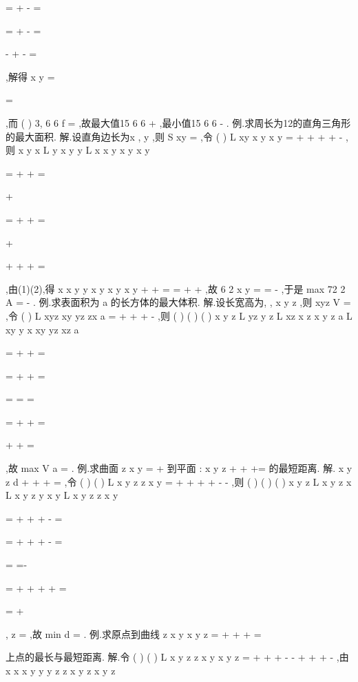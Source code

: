 =
+
\cdots 
-
=


=
+
\cdots 
-
=



-
+
-
=

,解得
x
y
=
\pm 

=
\pm 

,而 
(
)
3,
6 6
f
\pm 
\pm 
=
\pm 
,故最大值15
6 6
+
,最小值15
6 6
-
. 
\textcolor{lyred}{例}.求周长为12的直角三角形的最大面积. 
解.设直角边长为x , y ,则
S
xy
=
,令
(
)
L
xy
x
y
x
y
\lambda 
=
+
+
+
+
-
,则 
x
y
x
L
y
x
y
y
L
x
x
y
x
y
x
y
\lambda 
\lambda 






=
+
+
=



+








=
+
+
=



+




+
+
+
=



,由(1)(2),得
x
x
y
y
x
y
x
y
x
y
+
+
=
\Rightarrow 
=
+
+
,故 
6 2
x
y
=
=
-
,于是
max
72 2
A
=
-
. 
\textcolor{lyred}{例}.求表面积为
a 的长方体的最大体积. 
解.设长宽高为, ,
x y z ,则
xyz
V =
,令
(
)
L
xyz
xy
yz
zx
a
\lambda 
=
+
+
+
-
,则 
(
)
(
)
(
)
x
y
z
L
yz
y
z
L
xz
x
z
x
y
z
a
L
xy
y
x
xy
yz
xz
a
\lambda 
\lambda 
\lambda 

=
+
+
=

=
+
+
=

\Rightarrow 
=
=
=

=
+
+
=


+
+
=

,故
max
V
a
=
. 
\textcolor{lyred}{例}.求曲面
z
x
y
=
+
到平面
:
x
y
z
\Pi 
+
+
+=
的最短距离. 
解.
x
y
z
d
+
+
+
=
,令
(
)
(
)
L
x
y
z
z
x
y
\lambda 
=
+
+
+
+
-
-
,则 
(
)
(
)
(
)
x
y
z
L
x
y
z
x
L
x
y
z
y
x
y
L
x
y
z
z
x
y
\lambda 
\lambda 
\lambda 

=
+
+
+
-
=

=
+
+
+
-
=

\Rightarrow 
=
=-

=
+
+
+
+
=

=
+

,
z =
,故
min
d
=
. 
\textcolor{lyred}{例}.求原点到曲线
z
x
y
x
y
z
=
+
+
+
=

上点的最长与最短距离. 
解.令
(
)
(
)
L
x
y
z
z
x
y
x
y
z
\lambda 
\mu 
=
+
+
+
-
-
+
+
+
-
,由 
x
x
x
y
y
y
z
z
x
y
z
x
y
z
\lambda 
\mu 
\lambda 
\mu 
\lambda 
\mu 

